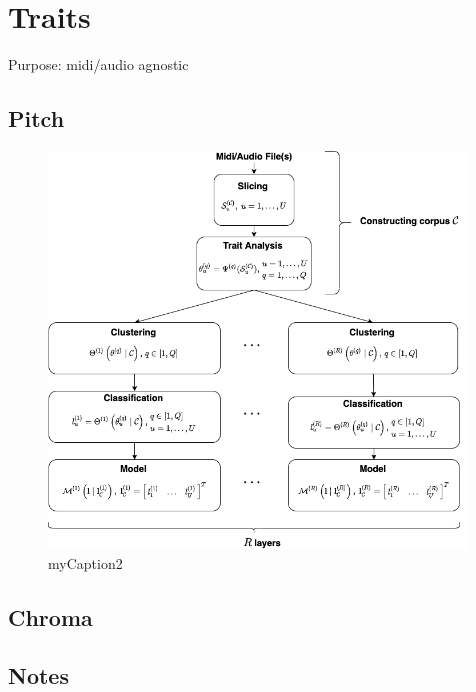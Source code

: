 \section{Traits}\label{sec:3-traits}
Purpose: midi/audio agnostic

\subsection{Pitch}\label{sec:3-traits-pitch}

 \begin{figure}
    \centering        
 	\includegraphics[width=0.99\textwidth]{figures/3-somax-corpus.png}
    \caption{myCaption2}
    \label{fig:myFig}
\end{figure}

\subsection{Chroma}\label{sec:3-traits-harmony}

\subsection{Notes}\label{sec:3-traits-notes}